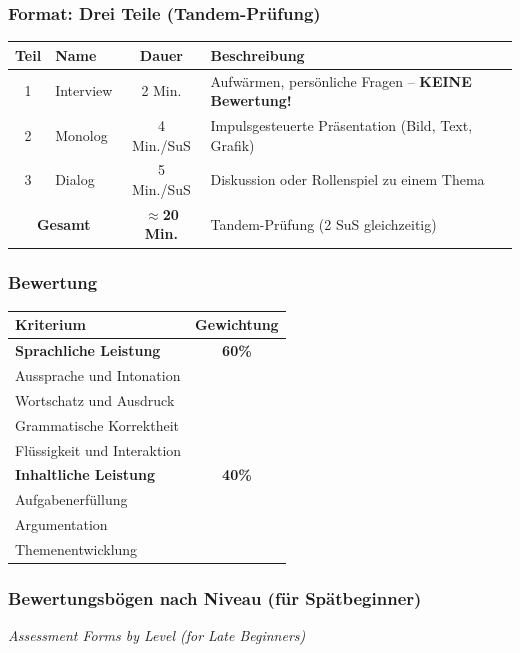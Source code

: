 \documentclass[10pt,a4paper]{article}
\begin{document}
\subsubsection{Format: Drei Teile (Tandem-Prüfung)}

\begin{center}
\begin{tabular}{|c|p{3.5cm}|c|p{6cm}|}
\hline
\rowcolor{spaet}\color{white}\textbf{Teil} & \color{white}\textbf{Name} & \color{white}\textbf{Dauer} & \color{white}\textbf{Beschreibung} \\
\hline
1 & Interview & 2 Min. & Aufwärmen, persönliche Fragen -- \textbf{KEINE Bewertung!} \\
\hline
2 & Monolog & 4 Min./SuS & Impulsgesteuerte Präsentation (Bild, Text, Grafik) \\
\hline
3 & Dialog & 5 Min./SuS & Diskussion oder Rollenspiel zu einem Thema \\
\hline
\multicolumn{2}{|c|}{\textbf{Gesamt}} & \textbf{$\approx$20 Min.} & Tandem-Prüfung (2 SuS gleichzeitig) \\
\hline
\end{tabular}
\end{center}

\subsubsection{Bewertung}

\begin{center}
\begin{tabular}{|p{6cm}|c|}
\hline
\rowcolor{lightgray}
\textbf{Kriterium} & \textbf{Gewichtung} \\
\hline
\textbf{Sprachliche Leistung} & \textbf{60\%} \\
\quad Aussprache und Intonation & \\
\quad Wortschatz und Ausdruck & \\
\quad Grammatische Korrektheit & \\
\quad Flüssigkeit und Interaktion & \\
\hline
\textbf{Inhaltliche Leistung} & \textbf{40\%} \\
\quad Aufgabenerfüllung & \\
\quad Argumentation & \\
\quad Themenentwicklung & \\
\hline
\end{tabular}
\end{center}

\subsubsection{Bewertungsbögen nach Niveau (für Spätbeginner)}
{\small\color{englishgray}\textit{Assessment Forms by Level (for Late Beginners)}}
\end{document}
